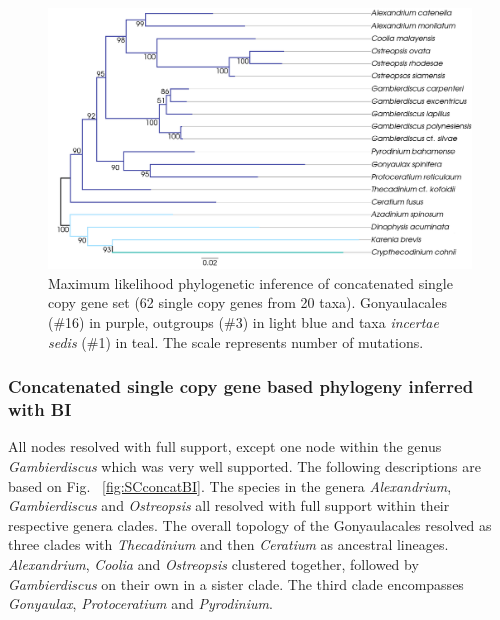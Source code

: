 \documentclass[12pt]{article}
\begin{document}
\begin{figure} 
\includegraphics[scale=.45]{figures/Singlecopy-concat-ML.png} 
\caption{Maximum likelihood phylogenetic inference of concatenated single copy gene set (62 single copy genes from 20 taxa). Gonyaulacales (\#16) in purple, outgroups (\#3) in light blue and taxa \textit{incertae sedis} (\#1) in teal. The scale represents number of mutations.} 
\label{fig:SCconcatML}
\end{figure} 
\FloatBarrier

\subsubsection*{Concatenated single copy gene based phylogeny inferred with BI}
\FloatBarrier 
All nodes resolved with full support, except one node within the genus \textit{Gambierdiscus} which was very well supported. 
The following descriptions are based on Fig. ~\ref{fig:SCconcatBI}. 
The species in the genera \textit{Alexandrium}, \textit{Gambierdiscus} and \textit{Ostreopsis} all resolved with full support within their respective genera clades. 
The overall topology of the Gonyaulacales resolved as three clades with \textit{Thecadinium} and then \textit{Ceratium} as ancestral lineages. 
\textit{Alexandrium}, \textit{Coolia} and \textit{Ostreopsis} clustered together, followed by \textit{Gambierdiscus} on their own in a sister clade. 
The third clade encompasses \textit{Gonyaulax}, \textit{Protoceratium} and \textit{Pyrodinium}. 
\end{document}
